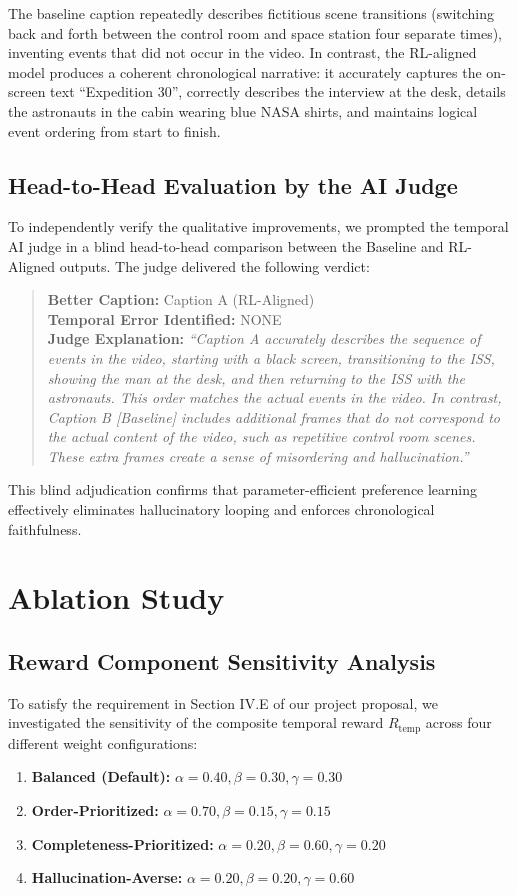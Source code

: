 \documentclass[journal]{IEEEtai}
\begin{document}
The baseline caption repeatedly describes fictitious scene transitions (switching back and forth between the control room and space station four separate times), inventing events that did not occur in the video. In contrast, the RL-aligned model produces a coherent chronological narrative: it accurately captures the on-screen text ``Expedition 30'', correctly describes the interview at the desk, details the astronauts in the cabin wearing blue NASA shirts, and maintains logical event ordering from start to finish.

\subsection{Head-to-Head Evaluation by the AI Judge}
To independently verify the qualitative improvements, we prompted the temporal AI judge in a blind head-to-head comparison between the Baseline and RL-Aligned outputs. The judge delivered the following verdict:
\begin{quote}
\textbf{Better Caption:} Caption A (RL-Aligned) \\
\textbf{Temporal Error Identified:} NONE \\
\textbf{Judge Explanation:} \textit{``Caption A accurately describes the sequence of events in the video, starting with a black screen, transitioning to the ISS, showing the man at the desk, and then returning to the ISS with the astronauts. This order matches the actual events in the video. In contrast, Caption B [Baseline] includes additional frames that do not correspond to the actual content of the video, such as repetitive control room scenes. These extra frames create a sense of misordering and hallucination.''}
\end{quote}
This blind adjudication confirms that parameter-efficient preference learning effectively eliminates hallucinatory looping and enforces chronological faithfulness.

\section{Ablation Study}

\subsection{Reward Component Sensitivity Analysis}
To satisfy the requirement in Section IV.E of our project proposal, we investigated the sensitivity of the composite temporal reward $R_{\text{temp}}$ across four different weight configurations:
\begin{enumerate}
    \item \textbf{Balanced (Default):} $\alpha=0.40, \beta=0.30, \gamma=0.30$
    \item \textbf{Order-Prioritized:} $\alpha=0.70, \beta=0.15, \gamma=0.15$
    \item \textbf{Completeness-Prioritized:} $\alpha=0.20, \beta=0.60, \gamma=0.20$
    \item \textbf{Hallucination-Averse:} $\alpha=0.20, \beta=0.20, \gamma=0.60$
\end{enumerate}
\end{document}
